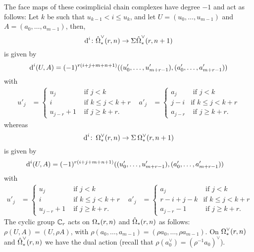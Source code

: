 	The face maps of these cosimplicial chain complexes have degree $-1$ and act as follows: Let $k$ be such that $u_{k-1}<i\leq u_k$, and let $U = (u_0,\ldots,u_{m-1})$ and $A = (a_0,\ldots,a_{m-1})$, then,
	\[
		\operatorname{d}^i \colon  \hat{\operatorname{\Omega}}^{\vee}_{*}(r,n)\to \Sigma^{}\hat{\operatorname{\Omega}}^{\vee}_{*}(r,n+1)
	\]
		is given by
	\[\operatorname{d}^i(U, A) = (-1)^{r(i+j+m+n+1)}((u'_0,\ldots,u'_{m+r-1}),(a'_0,\ldots,a'_{m+r-1}))\] with
\begin{align}\label{eq:Omegahat}
	u'_j &=
	\begin{cases}
		u_j &\text{ if $j<k$} \\
		i & \text{ if $k\leq j < k+r$} \\
		u_{j-r} + 1 & \text{ if $j\geq k+r$.}
	\end{cases}
	&
	a'_j &=
	\begin{cases}
		a_j &\text{ if $j<k$} \\
		j-i & \text{if $k\leq j<k+r$} \\
		a_{j-r} & \text{ if $j\geq k+r$.}
	\end{cases}
\end{align}
whereas
\[
	\operatorname{d}^i \colon  \operatorname{\Omega}^{\vee}_{*}(r,n)\to \Sigma^{}\operatorname{\Omega}^{\vee}_{*}(r,n+1)
	\]
	is given by
\begin{align*}
	\operatorname{d}^i(U, A) &= (-1)^{r(i + j + m + n + 1)}((u'_0,\ldots,u'_{m+r-1}),(a'_0,\ldots,a'_{m+r-1}))
\end{align*}
with
\begin{align}\label{eq:Theta}
	u'_j &=
	\begin{cases}
		u_j &\text{ if $j<k$} \\
		i & \text{ if $k\leq j < k+r$} \\
		u_{j-r} + 1 & \text{ if $j\geq k+r$.}
	\end{cases}
	&
	a'_j &=
	\begin{cases}
		a_j &\text{ if $j<k$} \\
		r-i+j-k & \text{if $k\leq j<k+r$} \\
		a_{j-r}-1 & \text{ if $j\geq k+r$.}
	\end{cases}
\end{align}
The cyclic group $\mathbb{C}_r$ acts on $\operatorname{\Omega}_{*}(r,n)$ and $\hat{\operatorname{\Omega}}_{*}(r,n)$ as follows: $\rho(U,A) = (U,\rho A)$, with $\rho(a_0,\ldots,a_{m-1}) = (\rho a_0,\ldots,\rho a_{m-1})$. On $\operatorname{\Omega}^{\vee}_{*}(r,n)$ and $\hat{\operatorname{\Omega}}^{\vee}_{*}(r,n)$ we have the dual action (recall that $\rho(a_0^\vee) = (\rho^{-1}a_0)^\vee$).

